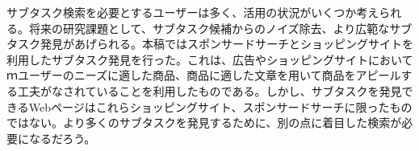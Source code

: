 \documentclass[submit,techreq]{ipsj}
\begin{document}
サブタスク検索を必要とするユーザーは多く、活用の状況がいくつか考えられる。将来の研究課題として、サブタスク候補からのノイズ除去、より広範なサブタスク発見があげられる。本稿ではスポンサードサーチとショッピングサイトを利用したサブタスク発見を行った。これは、広告やショッピングサイトにおいてｍユーザーのニーズに適した商品、商品に適した文章を用いて商品をアピールする工夫がなされていることを利用したものである。しかし、サブタスクを発見できるWebページはこれらショッピングサイト、スポンサードサーチに限ったものではない。より多くのサブタスクを発見するために、別の点に着目した検索が必要になるだろう。




\end{document}
